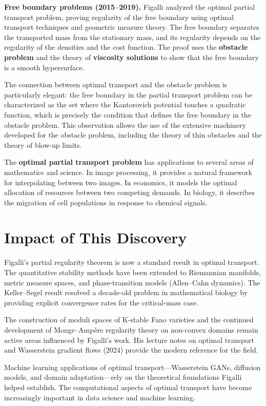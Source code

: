 \textbf{Free boundary problems (2015--2019).} Figalli analyzed the optimal partial transport problem, proving regularity of the free boundary using optimal transport techniques and geometric measure theory. The free boundary separates the transported mass from the stationary mass, and its regularity depends on the regularity of the densities and the cost function. The proof uses the \textbf{obstacle problem} and the theory of \textbf{viscosity solutions} to show that the free boundary is a smooth hypersurface.

The connection between optimal transport and the obstacle problem is particularly elegant: the free boundary in the partial transport problem can be characterized as the set where the Kantorovich potential touches a quadratic function, which is precisely the condition that defines the free boundary in the obstacle problem. This observation allows the use of the extensive machinery developed for the obstacle problem, including the theory of thin obstacles and the theory of blow-up limits.

The \textbf{optimal partial transport problem} has applications to several areas of mathematics and science. In image processing, it provides a natural framework for interpolating between two images. In economics, it models the optimal allocation of resources between two competing demands. In biology, it describes the migration of cell populations in response to chemical signals.

\section{Impact of This Discovery}

Figalli's partial regularity theorem is now a standard result in optimal transport. The quantitative stability methods have been extended to Riemannian manifolds, metric measure spaces, and phase-transition models (Allen--Cahn dynamics). The Keller--Segel result resolved a decade-old problem in mathematical biology by providing explicit convergence rates for the critical-mass case.

The construction of moduli spaces of K-stable Fano varieties and the continued development of Monge--Amp\`ere regularity theory on non-convex domains remain active areas influenced by Figalli's work. His lecture notes on optimal transport and Wasserstein gradient flows (2024) provide the modern reference for the field.

Machine learning applications of optimal transport---Wasserstein GANs, diffusion models, and domain adaptation---rely on the theoretical foundations Figalli helped establish. The computational aspects of optimal transport have become increasingly important in data science and machine learning.

